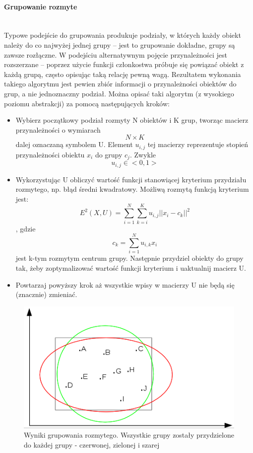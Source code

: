 \documentclass{article}
\newcommand{\myparagraph}[1]{\paragraph{#1}\mbox{}\\}
\begin{document}
\myparagraph{Grupowanie rozmyte}

Typowe podejście do grupowania produkuje podziały, w których każdy obiekt należy do co najwyżej jednej grupy – jest to grupowanie dokładne, grupy są zawsze rozłączne. W podejściu alternatywnym pojęcie przynależności jest rozszerzane – poprzez użycie funkcji członkostwa próbuje się powiązać obiekt z każdą grupą, często opisując taką relację pewną wagą. Rezultatem wykonania takiego algorytmu jest pewien zbiór informacji o przynależności obiektów do grup, a nie jednoznaczny podział. Można opisać taki algorytm (z wysokiego poziomu abstrakcji) za pomocą następujących kroków:

\begin{itemize}
	\item Wybierz początkowy podział rozmyty N obiektów i K grup, tworząc macierz przynależności o wymiarach \[N\times K\] dalej oznaczaną symbolem U. Element $u_{i,j}$ tej macierzy reprezentuje stopień przynależności obiektu $x_{i}$ do grupy $c_{j}$. Zwykle \[u_{i,j} \in <0, 1> \]
	\item Wykorzystując U obliczyć wartość funkcji stanowiącej kryterium przydziału rozmytego, np. błąd średni kwadratowy. Możliwą rozmytą funkcją kryterium jest:
	\[E^2(X, U) = \sum_{i=1}^{N}\sum_{k=i}^{K}u_{i,j}||x_{i}-c_{k}||^2 \], gdzie \[ c_{k} = \sum_{i=1}^{N}u_{i,k}x_{i} \] jest k-tym rozmytym centrum grupy. Następnie przydziel obiekty do grupy tak, żeby zoptymalizować wartość funkcji kryterium i uaktualnij macierz U.
	\item Powtarzaj powyższy krok aż wszystkie wpisy w macierzy U nie będą się (znacznie) zmieniać.
\end{itemize}

\begin{figure}[H]
	\centering
	\includegraphics[scale=0.9]{rozmytewyniki.png}
	\caption{Wyniki grupowania rozmytego. Wszystkie grupy zostały przydzielone do każdej grupy - czerwonej, zielonej i szarej}
	\label{fig:rozmytewyniki}
\end{figure}
\end{document}
